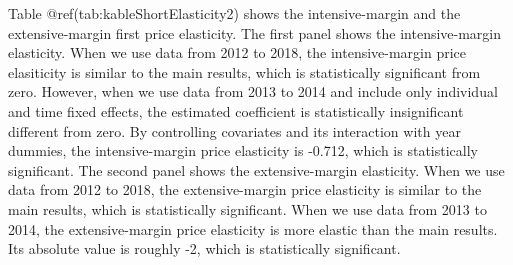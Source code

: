 \documentclass[
]{article}
\begin{document}
Table @ref(tab:kableShortElasticity2) shows the intensive-margin and the extensive-margin first price elasticity.
The first panel shows the intensive-margin elasticity.
When we use data from 2012 to 2018, the intensive-margin price elasiticity is similar to the main results,
which is statistically significant from zero.
However, when we use data from 2013 to 2014 and include only individual and time fixed effects,
the estimated coefficient is statistically insignificant different from zero.
By controlling covariates and its interaction with year dummies,
the intensive-margin price elasticity is -0.712, which is statistically significant.
The second panel shows the extensive-margin elasticity.
When we use data from 2012 to 2018, the extensive-margin price elasticity is similar to the main results,
which is statistically significant.
When we use data from 2013 to 2014, the extensive-margin price elasticity is more elastic than the main results.
Its absolute value is roughly -2, which is statistically significant.
\end{document}
